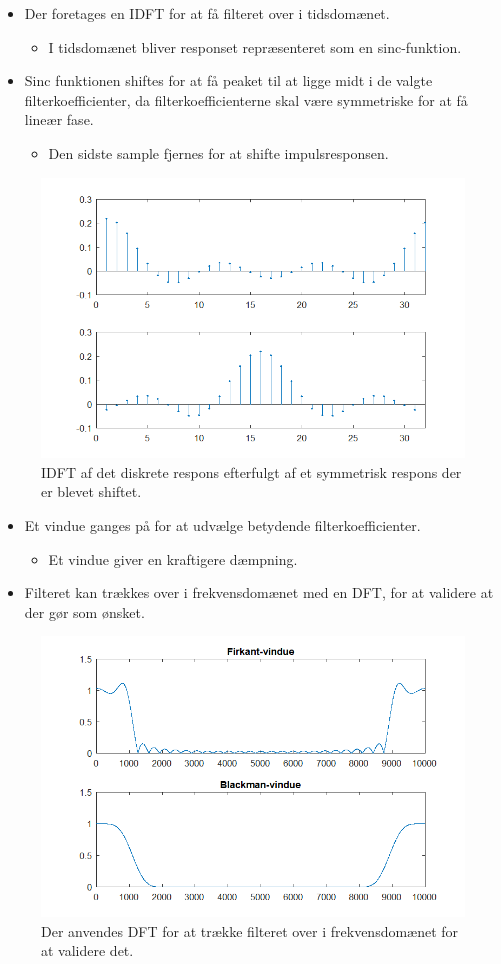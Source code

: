 \documentclass[danish]{article}
\begin{document}
\begin{itemize}
	\item Der foretages en IDFT for at få filteret over i tidsdomænet.
	\begin{itemize}
		\item I tidsdomænet bliver responset repræsenteret som en sinc-funktion.
	\end{itemize}
	\item Sinc funktionen shiftes for at få peaket til at ligge midt i de valgte filterkoefficienter, da filterkoefficienterne skal være symmetriske for at få lineær fase.
	\begin{itemize}
		\item Den sidste sample fjernes for at shifte impulsresponsen.
	\end{itemize}
\end{itemize}

\begin{figure}[H]
	\centering
	\includegraphics[width=0.6\linewidth]{graphics/windowmethod_2}
	\caption{IDFT af det diskrete respons efterfulgt af et symmetrisk respons der er blevet shiftet.}
	\label{fig:windowmethod_2}
\end{figure}

\begin{itemize}
	\item Et vindue ganges på for at udvælge betydende filterkoefficienter.
	\begin{itemize}
		\item Et vindue giver en kraftigere dæmpning.
	\end{itemize}
	\item Filteret kan trækkes over i frekvensdomænet med en DFT, for at validere at der gør som ønsket.
\end{itemize}

\begin{figure}[H]
	\centering
	\includegraphics[width=0.6\linewidth]{graphics/windowmethod_3}
	\caption{Der anvendes DFT for at trække filteret over i frekvensdomænet for at validere det.}
	\label{fig:windowmethod_3}
\end{figure}
\end{document}
